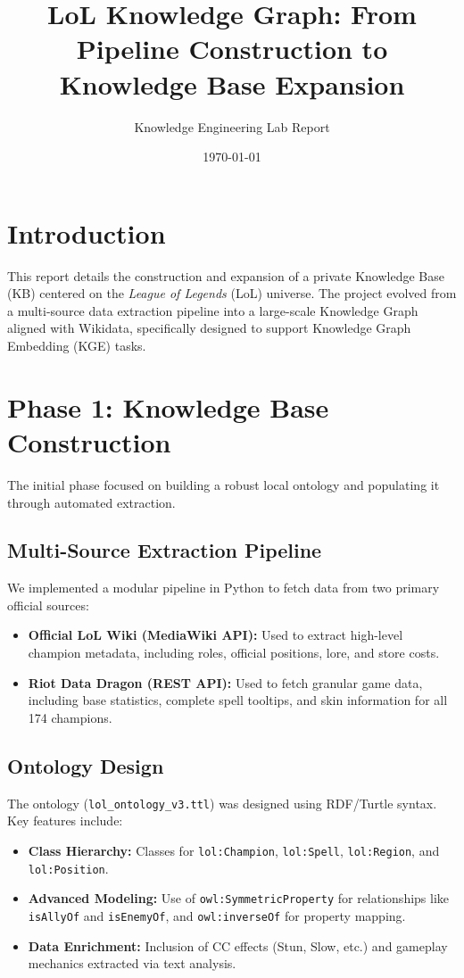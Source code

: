 \documentclass[11pt,a4paper]{article}
\title{LoL Knowledge Graph: From Pipeline Construction to Knowledge Base Expansion}
\author{Knowledge Engineering Lab Report}
\date{\today}
\begin{document}
\maketitle

\section{Introduction}
This report details the construction and expansion of a private Knowledge Base (KB) centered on the \textit{League of Legends} (LoL) universe. The project evolved from a multi-source data extraction pipeline into a large-scale Knowledge Graph aligned with Wikidata, specifically designed to support Knowledge Graph Embedding (KGE) tasks.

\section{Phase 1: Knowledge Base Construction}
The initial phase focused on building a robust local ontology and populating it through automated extraction.

\subsection{Multi-Source Extraction Pipeline}
We implemented a modular pipeline in Python to fetch data from two primary official sources:
\begin{itemize}
    \item \textbf{Official LoL Wiki (MediaWiki API):} Used to extract high-level champion metadata, including roles, official positions, lore, and store costs.
    \item \textbf{Riot Data Dragon (REST API):} Used to fetch granular game data, including base statistics, complete spell tooltips, and skin information for all 174 champions.
\end{itemize}

\subsection{Ontology Design}
The ontology (\texttt{lol\_ontology\_v3.ttl}) was designed using RDF/Turtle syntax. Key features include:
\begin{itemize}
    \item \textbf{Class Hierarchy:} Classes for \texttt{lol:Champion}, \texttt{lol:Spell}, \texttt{lol:Region}, and \texttt{lol:Position}.
    \item \textbf{Advanced Modeling:} Use of \texttt{owl:SymmetricProperty} for relationships like \texttt{isAllyOf} and \texttt{isEnemyOf}, and \texttt{owl:inverseOf} for property mapping.
    \item \textbf{Data Enrichment:} Inclusion of CC effects (Stun, Slow, etc.) and gameplay mechanics extracted via text analysis.
\end{itemize}
\end{document}
